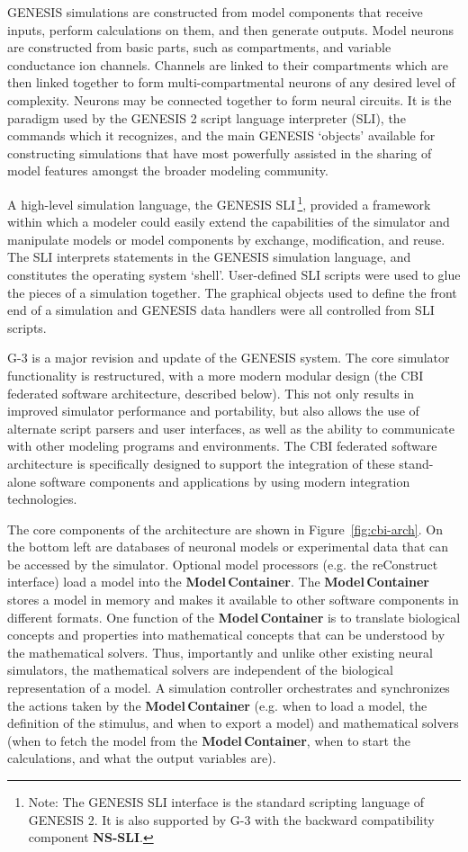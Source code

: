 \documentclass[12pt]{article}
\begin{document}
GENESIS simulations are constructed from model components that receive
inputs, perform calculations on them, and then generate outputs. Model
neurons are constructed from basic parts, such as compartments, and
variable conductance ion channels. Channels are linked to their
compartments which are then linked together to form
multi-compartmental neurons of any desired level of complexity.
Neurons may be connected together to form neural circuits.  It is the
paradigm used by the GENESIS 2 script language interpreter (SLI), the
commands which it recognizes, and the main GENESIS `objects' available
for constructing simulations that have most powerfully assisted in the
sharing of model features amongst the broader modeling community.

A high-level simulation language, the GENESIS SLI\,\footnote{Note: The
  GENESIS SLI interface is the standard scripting language of GENESIS
  2. It is also supported by G-3 with the backward compatibility
  component {\bf NS-SLI}.}, provided a framework within which a
modeler could easily extend the capabilities of
the simulator and manipulate models or model components by exchange, modification, and reuse. The SLI interprets statements in the
GENESIS simulation language, and constitutes the operating system
`shell'. User-defined SLI scripts were used to glue the pieces of a
simulation together. The graphical objects used to define the front
end of a simulation and GENESIS data handlers were all controlled from
SLI scripts.

G-3 is a major revision and update of the GENESIS system.  The core
simulator functionality is restructured, with a more modern modular
design (the CBI federated software architecture, described below). This not
only results in improved simulator performance and portability, but
also allows the use of alternate script parsers and user interfaces,
as well as the ability to communicate with other modeling programs and
environments. The CBI federated software architecture is specifically designed
to support the integration of these stand-alone software components
and applications by using modern integration technologies.

The core components of the architecture are shown in
Figure~\ref{fig:cbi-arch}. On the bottom left are databases of
neuronal models or experimental data that can be accessed by the
simulator. Optional model processors (e.g. the reConstruct interface) load a model into the {\bf Model\,Container}.  The {\bf Model\,Container}
stores a model in memory and makes it available to other software
components in different formats.  One function of the {\bf Model\,Container}
is to translate biological concepts and properties into mathematical
concepts that can be understood by the mathematical solvers. Thus,
importantly and unlike other existing neural simulators, the
mathematical solvers are independent of the biological representation
of a model. A simulation controller orchestrates and synchronizes
the actions taken by the {\bf Model\,Container} (e.g. when to load a model,
the definition of the stimulus, and when to export a model) and
mathematical solvers (when to fetch the model from the {\bf Model\,Container}, when to start the calculations, and what the output
variables are).
\end{document}
